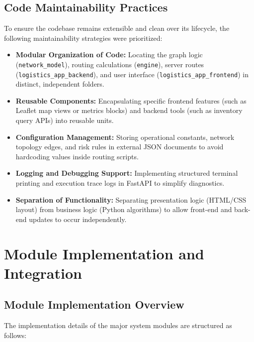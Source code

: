 \subsection[Code Maintainability Practices]{Code Maintainability Practices}
To ensure the codebase remains extensible and clean over its lifecycle, the following maintainability strategies were prioritized:

\begin{itemize}
    \item \textbf{Modular Organization of Code:} Locating the graph logic (\texttt{network\_model}), routing calculations (\texttt{engine}), server routes (\texttt{logistics\_app\_backend}), and user interface (\texttt{logistics\_app\_frontend}) in distinct, independent folders.
    \item \textbf{Reusable Components:} Encapsulating specific frontend features (such as Leaflet map views or metrics blocks) and backend tools (such as inventory query APIs) into reusable units.
    \item \textbf{Configuration Management:} Storing operational constants, network topology edges, and risk rules in external JSON documents to avoid hardcoding values inside routing scripts.
    \item \textbf{Logging and Debugging Support:} Implementing structured terminal printing and execution trace logs in FastAPI to simplify diagnostics.
    \item \textbf{Separation of Functionality:} Separating presentation logic (HTML/CSS layout) from business logic (Python algorithms) to allow front-end and back-end updates to occur independently.
\end{itemize}
\section[Module Implementation and Integration]{Module Implementation and Integration}

\subsection[Module Implementation Overview]{Module Implementation Overview}
The implementation details of the major system modules are structured as follows:

